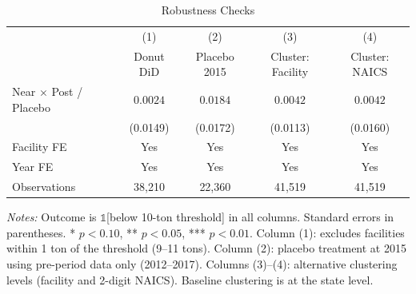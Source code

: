 \begin{table}[H]
\centering
\caption{Robustness Checks}
\label{tab:robust}
\begin{threeparttable}
\begin{tabular}{lcccc}
\toprule
 & (1) & (2) & (3) & (4) \\
 & Donut DiD & Placebo 2015 & Cluster: Facility & Cluster: NAICS \\
\midrule
Near $\times$ Post / Placebo & $0.0024$ & $0.0184$ & $0.0042$ & $0.0042$ \\
 & (0.0149) & (0.0172) & (0.0113) & (0.0160) \\
\midrule
Facility FE & Yes & Yes & Yes & Yes \\
Year FE & Yes & Yes & Yes & Yes \\
Observations & 38,210 & 22,360 & 41,519 & 41,519 \\
\bottomrule
\end{tabular}
\begin{tablenotes}[flushleft]
\small
\item \textit{Notes:} Outcome is $\mathbb{1}$[below 10-ton threshold] in all columns. Standard errors in parentheses. * $p<0.10$, ** $p<0.05$, *** $p<0.01$. Column (1): excludes facilities within 1 ton of the threshold (9--11 tons). Column (2): placebo treatment at 2015 using pre-period data only (2012--2017). Columns (3)--(4): alternative clustering levels (facility and 2-digit NAICS). Baseline clustering is at the state level.
\end{tablenotes}
\end{threeparttable}
\end{table}

